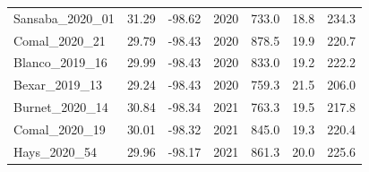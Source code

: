 \begin{table}
{\begin{tabular}{p{5cm}p{3cm}p{3cm}p{3cm}p{3cm}p{3cm}p{3cm}}
            \multicolumn{1}{l}{Sansaba\_2020\_01} 
            & \multicolumn{1}{r}{31.29}
            & \multicolumn{1}{r}{-98.62}
            & \multicolumn{1}{r}{2020}
            & \multicolumn{1}{r}{733.0}
            & \multicolumn{1}{r}{18.8}
            & \multicolumn{1}{r}{234.3}
            \\

            \multicolumn{1}{l}{Comal\_2020\_21} 
            & \multicolumn{1}{r}{29.79}
            & \multicolumn{1}{r}{-98.43}
            & \multicolumn{1}{r}{2020}
            & \multicolumn{1}{r}{878.5}
            & \multicolumn{1}{r}{19.9}
            & \multicolumn{1}{r}{220.7}
            \\

            \multicolumn{1}{l}{Blanco\_2019\_16} 
            & \multicolumn{1}{r}{29.99}
            & \multicolumn{1}{r}{-98.43}
            & \multicolumn{1}{r}{2020}
            & \multicolumn{1}{r}{833.0}
            & \multicolumn{1}{r}{19.2}
            & \multicolumn{1}{r}{222.2}
            \\

            \multicolumn{1}{l}{Bexar\_2019\_13} 
            & \multicolumn{1}{r}{29.24}
            & \multicolumn{1}{r}{-98.43}
            & \multicolumn{1}{r}{2020}
            & \multicolumn{1}{r}{759.3}
            & \multicolumn{1}{r}{21.5}
            & \multicolumn{1}{r}{206.0}
            \\

            \multicolumn{1}{l}{Burnet\_2020\_14} 
            & \multicolumn{1}{r}{30.84}
            & \multicolumn{1}{r}{-98.34}
            & \multicolumn{1}{r}{2021}
            & \multicolumn{1}{r}{763.3}
            & \multicolumn{1}{r}{19.5}
            & \multicolumn{1}{r}{217.8}
            \\

            \multicolumn{1}{l}{Comal\_2020\_19} 
            & \multicolumn{1}{r}{30.01}
            & \multicolumn{1}{r}{-98.32}
            & \multicolumn{1}{r}{2021}
            & \multicolumn{1}{r}{845.0}
            & \multicolumn{1}{r}{19.3}
            & \multicolumn{1}{r}{220.4}
            \\

            \multicolumn{1}{l}{Hays\_2020\_54} 
            & \multicolumn{1}{r}{29.96}
            & \multicolumn{1}{r}{-98.17}
            & \multicolumn{1}{r}{2021}
            & \multicolumn{1}{r}{861.3}
            & \multicolumn{1}{r}{20.0}
            & \multicolumn{1}{r}{225.6}
            \\


\end{tabular}}
\end{table}

